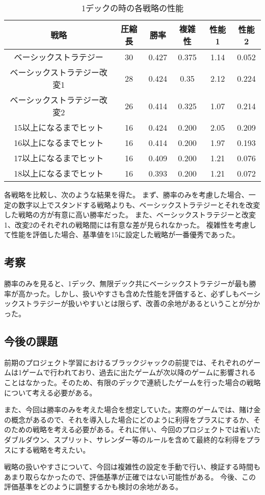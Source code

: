 \begin{table}[H]
\caption{1デックの時の各戦略の性能}
\label{table:data_type}
\begin{center}
\begin{tabular}{|c|c|c|c|c|c|}
\hline
戦略           & 圧縮長 & 勝率    & 複雑性   & 性能1  & 性能2   \\ \hline
ベーシックストラテジー         & 30  & 0.427 & 0.375 & 1.14 & 0.052 \\ \hline
ベーシックストラテジー改変1      & 28  & 0.424 & 0.35  & 2.12 & 0.224 \\ \hline
ベーシックストラテジー改変2      & 26  & 0.414 & 0.325 & 1.07 & 0.214 \\ \hline
15以上になるまでヒット & 16  & 0.424 & 0.200 & 2.05 & 0.209 \\ \hline
16以上になるまでヒット & 16  & 0.414 & 0.200 & 1.97 & 0.193 \\ \hline
17以上になるまでヒット & 16  & 0.409 & 0.200 & 1.21 & 0.076 \\ \hline
18以上になるまでヒット & 16  & 0.393 & 0.200 & 1.21 & 0.072 \\ \hline
\end{tabular}
\end{center}
\end{table}

各戦略を比較し、次のような結果を得た。
まず、勝率のみを考慮した場合、一定の数字以上でスタンドする戦略よりも、ベーシックストラテジーとそれを改変した戦略の方が有意に高い勝率だった。
また、ベーシックストラテジーと改変1、改変2のそれぞれの戦略間には有意な差が見られなかった。
複雑性を考慮して性能を評価した場合、基準値を15に設定した戦略が一番優秀であった。


\subsection{考察}

勝率のみを見ると、1デック、無限デック共にベーシックストラテジーが最も勝率が高かった。しかし、扱いやすさも含めた性能を評価すると、必ずしもベーシックストラテジーが扱いやすいとは限らず、改善の余地があるということが分かった。


\subsection{今後の課題}

前期のプロジェクト学習におけるブラックジャックの前提では、それぞれのゲームは1ゲームで行われており、過去に出たゲームが次以降のゲームに影響されることはなかった。そのため、有限のデックで連続したゲームを行った場合の戦略について考える必要がある。

また、今回は勝率のみを考えた場合を想定していた。実際のゲームでは、賭け金の概念があるので、それを導入した場合にどのように利得をプラスにするか、そのための戦略を考える必要がある。それに伴い、今回のプロジェクトでは省いたダブルダウン、スプリット、サレンダー等のルールを含めて最終的な利得をプラスにする戦略を考えたい。

戦略の扱いやすさについて、今回は複雑性の設定を手動で行い、検証する時間もあまり取らなかったので、評価基準が正確ではない可能性がある。
今後、この評価基準をどのように調整するかも検討の余地がある。

